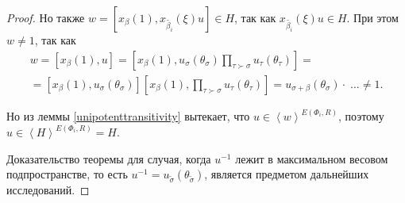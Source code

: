 \documentclass[10pt]{article}
\theoremstyle{remark}
\begin{document}
\begin{proof}
Но также $ w = [x_\beta(1), x_{\widetilde{\beta_i}}(\xi)u] \in H$, так как $x_{\widetilde{\beta_i}}(\xi)u \in H$. При этом $w \ne 1$, так как
\begin{align*}
w = [x_\beta(1),u] = [x_\beta(1),u_\sigma(\theta_\sigma)\prod_{\tau\succ\sigma}u_\tau(\theta_\tau)] =\\
=[x_\beta(1),u_\sigma(\theta_\sigma)][x_\beta(1),\prod_{\tau\succ\sigma}u_\tau(\theta_\tau)]=
u_{\sigma+\beta}(\theta_\sigma)\cdot \;\ldots \ne 1.
\end{align*}

Но из леммы \ref{unipotenttransitivity} вытекает, что
$u \in \left<w\right>^{E(\Phi_i,R)}$, поэтому $u \in \left<H\right>^{E(\Phi_i,R)} = H$.

Доказательство теоремы для случая, когда $u^{-1}$ лежит в максимальном весовом подпространстве, то есть $u^{-1}=u_{\widetilde\sigma}(\theta_{\widetilde\sigma})$, является предметом дальнейших исследований.


\end{proof}


\end{document}
